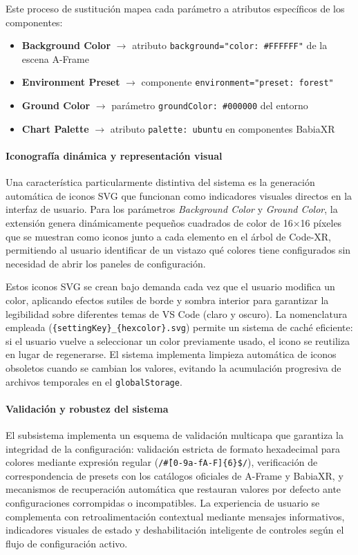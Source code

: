 \documentclass[a4paper, 12pt]{book}
\begin{document}
Este proceso de sustitución mapea cada parámetro a atributos específicos de los componentes:
\begin{itemize}
\item \textbf{Background Color} $\rightarrow$ atributo \texttt{background="color: \#FFFFFF"} de la escena A-Frame
\item \textbf{Environment Preset} $\rightarrow$ componente \texttt{environment="preset: forest"} 
\item \textbf{Ground Color} $\rightarrow$ parámetro \texttt{groundColor: \#000000} del entorno
\item \textbf{Chart Palette} $\rightarrow$ atributo \texttt{palette: ubuntu} en componentes BabiaXR
\end{itemize}

\paragraph{Iconografía dinámica y representación visual}
Una característica particularmente distintiva del sistema es la generación automática de iconos SVG que funcionan como indicadores visuales directos en la interfaz de usuario. Para los parámetros \emph{Background Color} y \emph{Ground Color}, la extensión genera dinámicamente pequeños cuadrados de color de 16×16 píxeles que se muestran como iconos junto a cada elemento en el árbol de Code-XR, permitiendo al usuario identificar de un vistazo qué colores tiene configurados sin necesidad de abrir los paneles de configuración.

Estos iconos SVG se crean bajo demanda cada vez que el usuario modifica un color, aplicando efectos sutiles de borde y sombra interior para garantizar la legibilidad sobre diferentes temas de VS Code (claro y oscuro). La nomenclatura empleada (\texttt{\{settingKey\}\_\{hexcolor\}.svg}) permite un sistema de caché eficiente: si el usuario vuelve a seleccionar un color previamente usado, el icono se reutiliza en lugar de regenerarse. El sistema implementa limpieza automática de iconos obsoletos cuando se cambian los valores, evitando la acumulación progresiva de archivos temporales en el \texttt{globalStorage}.

\paragraph{Validación y robustez del sistema}
El subsistema implementa un esquema de validación multicapa que garantiza la integridad de la configuración: validación estricta de formato hexadecimal para colores mediante expresión regular (\texttt{/\^\#[0-9a-fA-F]\{6\}\$/}), verificación de correspondencia de presets con los catálogos oficiales de A-Frame y BabiaXR, y mecanismos de recuperación automática que restauran valores por defecto ante configuraciones corrompidas o incompatibles. La experiencia de usuario se complementa con retroalimentación contextual mediante mensajes informativos, indicadores visuales de estado y deshabilitación inteligente de controles según el flujo de configuración activo.
\end{document}
